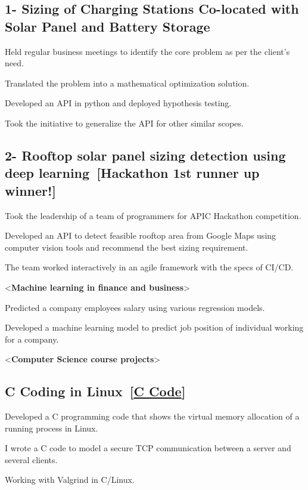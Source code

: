 \documentclass[letter,11pt]{article}
\begin{document}
	\subsection{1- Sizing of Charging Stations Co-located with Solar Panel and Battery Storage}
\begin{zitemize}
	\item Held regular business meetings to identify the core problem as per the client's need.
	\item Translated the problem into a mathematical optimization solution.
	\item Developed an API in python and deployed hypothesis testing.
	\item Took the initiative to generalize the API for other similar scopes.
\end{zitemize}

\subsection{2- Rooftop solar panel sizing detection using deep learning~[Hackathon 1st runner up winner!]}
\begin{zitemize}
 \item Took the leadership of a team of programmers for APIC Hackathon competition.
	\item Developed an API to detect feasible rooftop area from Google Maps using computer vision tools and recommend the best sizing requirement. 
	\item The team worked interactively in an agile framework with the specs of CI/CD.
\end{zitemize}

<\textbf{Machine learning in finance and business}>\vspace{-0.75em}
\begin{zitemize}
	\item Predicted a company employees salary using various regression models.
	\item Developed a machine learning model to predict job position of individual working for a company.
\end{zitemize}
<\textbf{Computer Science course projects}>
\subsection{C Coding in Linux~[\href{https://github.com/Hadi2525/vmemory_maps}{C Code}]}
\begin{zitemize}
	\item Developed a C programming code that shows the virtual memory allocation of a running process in Linux. 
	\item I wrote a C code to model a secure TCP communication between a server and several clients.
	\item Working with Valgrind in C/Linux.
\end{zitemize}
\end{document}

